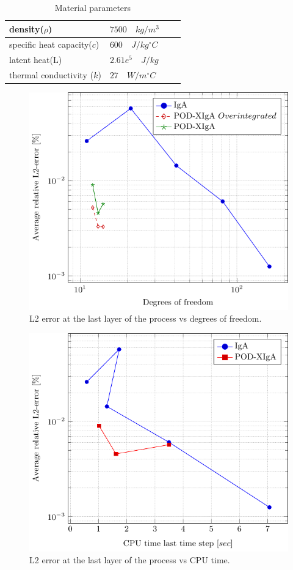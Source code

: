 \documentclass[3p]{article}
\begin{document}
\begin{table}[!h]
\centering
    \begin{tabular}{ | l | l | l | p{5cm} |}
    \hline
    density($\rho$) & $7500 \quad {kg}/{m^{3}}$\\ \hline
    specific heat capacity($c$) & $600 \quad {J}/{kg^{\circ}C}$\\ \hline
    latent heat($\mathrm{L}$) & $2.61e^{5} \quad {J}/{kg}$\\  \hline
    thermal conductivity ($k$) & $27 \quad {W}/{m^{\circ}C}$\\ 
    \hline
    \end{tabular}
\caption{Material parameters}
\label{table::materialParameters}
\end{table}

\begin{figure}[!h]
\centering
\includegraphics[width=0.75\linewidth]{externals/pgfplots/PODXIGA/L2ErrorVsDofs.pdf}

    \caption{L2 error at the last layer of the process vs degrees of freedom.}
    \label{L2DofsError}
\end{figure}

\begin{figure}[!h]
\centering
  \includegraphics[width=0.75\linewidth]{externals/pgfplots/PODXIGA/L2ErrorVsCPUTime.pdf}
    \caption{L2 error at the last layer of the process vs CPU time.}
	\label{L2TimeError} 
\end{figure}
\end{document}
